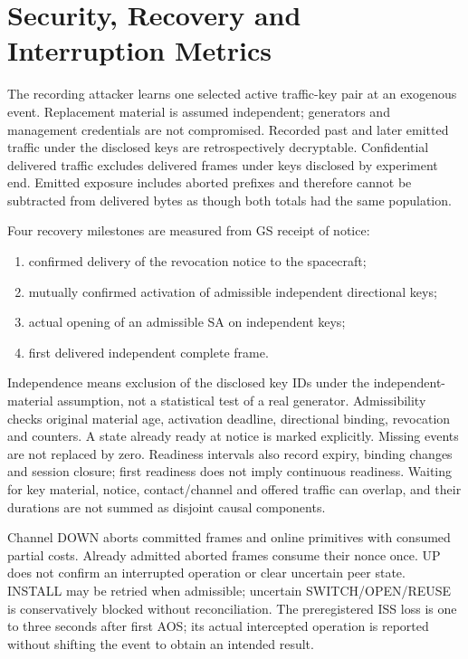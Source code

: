 \documentclass[11pt]{article}
\begin{document}
\section{Security, Recovery and Interruption Metrics}
The recording attacker learns one selected active traffic-key pair at an exogenous event.
Replacement material is assumed independent; generators and management credentials are
not compromised. Recorded past and later emitted traffic under the disclosed keys are
retrospectively decryptable. Confidential delivered traffic excludes delivered frames under
keys disclosed by experiment end. Emitted exposure includes aborted prefixes and therefore
cannot be subtracted from delivered bytes as though both totals had the same population.

Four recovery milestones are measured from GS receipt of notice:
\begin{enumerate}
\item confirmed delivery of the revocation notice to the spacecraft;
\item mutually confirmed activation of admissible independent directional keys;
\item actual opening of an admissible SA on independent keys;
\item first delivered independent complete frame.
\end{enumerate}
Independence means exclusion of the disclosed key IDs under the independent-material
assumption, not a statistical test of a real generator. Admissibility checks original material
age, activation deadline, directional binding, revocation and counters. A state already ready
at notice is marked explicitly. Missing events are not replaced by zero. Readiness intervals
also record expiry, binding changes and session closure; first readiness does not imply
continuous readiness. Waiting for key material, notice, contact/channel and offered traffic
can overlap, and their durations are not summed as disjoint causal components.

Channel DOWN aborts committed frames and online primitives with consumed partial costs.
Already admitted aborted frames consume their nonce once. UP does not confirm an interrupted
operation or clear uncertain peer state. INSTALL may be retried when admissible; uncertain
SWITCH/OPEN/REUSE is conservatively blocked without reconciliation. The preregistered ISS
loss is one to three seconds after first AOS; its actual intercepted operation is reported
without shifting the event to obtain an intended result.
\end{document}
